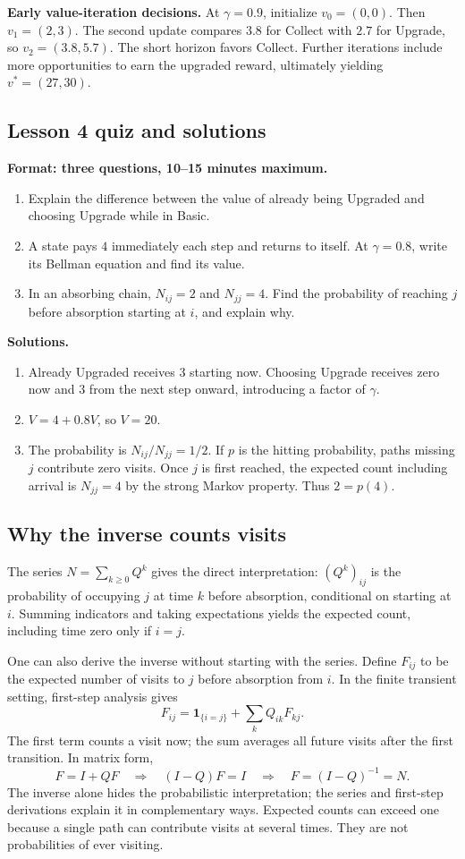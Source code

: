 \documentclass[11pt]{article}
\theoremstyle{remark}\newtheorem{remark}[definition]{Remark}
\begin{document}
\textbf{Early value-iteration decisions.} At $\gamma=0.9$, initialize $v_0=(0,0)$. Then $v_1=(2,3)$. The second update compares $3.8$ for Collect with $2.7$ for Upgrade, so $v_2=(3.8,5.7)$. The short horizon favors Collect. Further iterations include more opportunities to earn the upgraded reward, ultimately yielding $v^*=(27,30)$.

\clearpage
\subsection{Lesson 4 quiz and solutions}
\textbf{Format: three questions, 10--15 minutes maximum.}
\begin{enumerate}
\item Explain the difference between the value of already being Upgraded and choosing Upgrade while in Basic.
\item A state pays $4$ immediately each step and returns to itself. At $\gamma=0.8$, write its Bellman equation and find its value.
\item In an absorbing chain, $N_{ij}=2$ and $N_{jj}=4$. Find the probability of reaching $j$ before absorption starting at $i$, and explain why.
\end{enumerate}
\textbf{Solutions.}
\begin{enumerate}
\item Already Upgraded receives $3$ starting now. Choosing Upgrade receives zero now and $3$ from the next step onward, introducing a factor of $\gamma$.
\item $V=4+0.8V$, so $V=20$.
\item The probability is $N_{ij}/N_{jj}=1/2$. If $p$ is the hitting probability, paths missing $j$ contribute zero visits. Once $j$ is first reached, the expected count including arrival is $N_{jj}=4$ by the strong Markov property. Thus $2=p(4)$.
\end{enumerate}

\subsection{Why the inverse counts visits}
The series $N=\sum_{k\geq0}Q^k$ gives the direct interpretation: $(Q^k)_{ij}$ is the probability of occupying $j$ at time $k$ before absorption, conditional on starting at $i$. Summing indicators and taking expectations yields the expected count, including time zero only if $i=j$.

One can also derive the inverse without starting with the series. Define $F_{ij}$ to be the expected number of visits to $j$ before absorption from $i$. In the finite transient setting, first-step analysis gives
\[
F_{ij}=\mathbf1_{\{i=j\}}+\sum_kQ_{ik}F_{kj}.
\]
The first term counts a visit now; the sum averages all future visits after the first transition. In matrix form,
\[
F=I+QF\quad\Longrightarrow\quad(I-Q)F=I
\quad\Longrightarrow\quad\boxed{F=(I-Q)^{-1}=N.}
\]
The inverse alone hides the probabilistic interpretation; the series and first-step derivations explain it in complementary ways. Expected counts can exceed one because a single path can contribute visits at several times. They are not probabilities of ever visiting.
\end{document}
